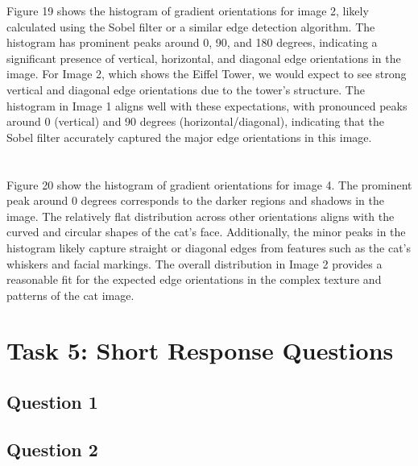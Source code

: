\documentclass[12pt]{article}
\begin{document}
Figure 19 shows the histogram of gradient orientations for image 2, likely calculated using the Sobel filter or a similar edge detection algorithm. The histogram has prominent peaks around 0, 90, and 180 degrees, indicating a significant presence of vertical, horizontal, and diagonal edge orientations in the image. For Image 2, which shows the Eiffel Tower, we would expect to see strong vertical and diagonal edge orientations due to the tower's structure. The histogram in Image 1 aligns well with these expectations, with pronounced peaks around 0 (vertical) and 90 degrees (horizontal/diagonal), indicating that the Sobel filter accurately captured the major edge orientations in this image.\\
\\
\\
Figure 20 show the histogram of gradient orientations for image 4. The prominent peak around 0 degrees corresponds to the darker regions and shadows in the image. The relatively flat distribution across other orientations aligns with the curved and circular shapes of the cat's face. Additionally, the minor peaks in the histogram likely capture straight or diagonal edges from features such as the cat's whiskers and facial markings. The overall distribution in Image 2 provides a reasonable fit for the expected edge orientations in the complex texture and patterns of the cat image.
\section{Task 5: Short Response Questions}

\subsection{Question 1}

\subsubsection{}

\subsubsection{}

\subsection{Question 2}


\subsubsection{}
\end{document}
